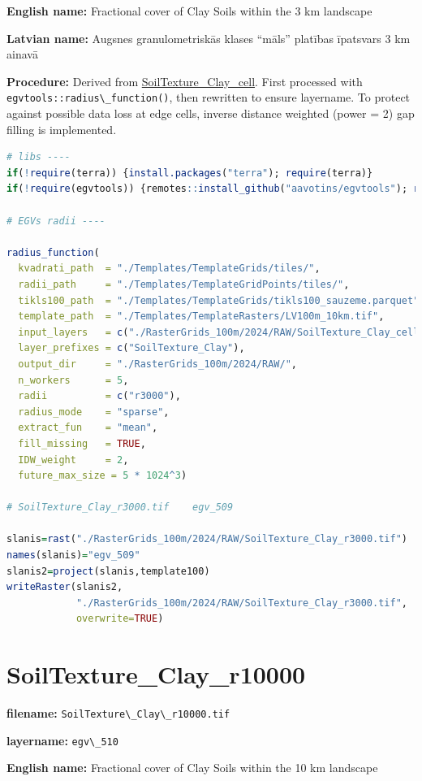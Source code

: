 \documentclass[
]{book}
\newcommand{\passthrough}[1]{#1}
\begin{document}
\textbf{English name:} Fractional cover of Clay Soils within the 3 km landscape

\textbf{Latvian name:} Augsnes granulometriskās klases ``māls'' platības īpatsvars 3 km ainavā

\textbf{Procedure:} Derived from \hyperref[ch06.506]{SoilTexture\_Clay\_cell}. First processed
with \passthrough{\lstinline!egvtools::radius\_function()!}, then rewritten to ensure layername. To protect against
possible data loss at edge cells, inverse distance weighted (power = 2) gap filling
is implemented.

\begin{lstlisting}[language=R]
# libs ----
if(!require(terra)) {install.packages("terra"); require(terra)}
if(!require(egvtools)) {remotes::install_github("aavotins/egvtools"); require(egvtools)}

# EGVs radii ----

radius_function(
  kvadrati_path  = "./Templates/TemplateGrids/tiles/",
  radii_path     = "./Templates/TemplateGridPoints/tiles/",
  tikls100_path  = "./Templates/TemplateGrids/tikls100_sauzeme.parquet",
  template_path  = "./Templates/TemplateRasters/LV100m_10km.tif",
  input_layers   = c("./RasterGrids_100m/2024/RAW/SoilTexture_Clay_cell.tif"),
  layer_prefixes = c("SoilTexture_Clay"),
  output_dir     = "./RasterGrids_100m/2024/RAW/",
  n_workers      = 5,
  radii          = c("r3000"),
  radius_mode    = "sparse",
  extract_fun    = "mean",
  fill_missing   = TRUE,
  IDW_weight     = 2,
  future_max_size = 5 * 1024^3)

# SoilTexture_Clay_r3000.tif    egv_509

slanis=rast("./RasterGrids_100m/2024/RAW/SoilTexture_Clay_r3000.tif")
names(slanis)="egv_509"
slanis2=project(slanis,template100)
writeRaster(slanis2,
            "./RasterGrids_100m/2024/RAW/SoilTexture_Clay_r3000.tif",
            overwrite=TRUE)
\end{lstlisting}

\section{SoilTexture\_Clay\_r10000}\label{ch06.510}

\textbf{filename:} \passthrough{\lstinline!SoilTexture\_Clay\_r10000.tif!}

\textbf{layername:} \passthrough{\lstinline!egv\_510!}

\textbf{English name:} Fractional cover of Clay Soils within the 10 km landscape
\end{document}
